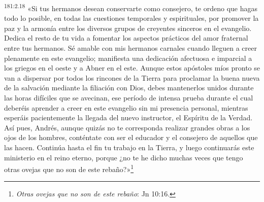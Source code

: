 \par 
\textsuperscript{181:2.18} «Si tus hermanos desean conservarte como consejero, te ordeno que hagas todo lo posible, en todas las cuestiones temporales y espirituales, por promover la paz y la armonía entre los diversos grupos de creyentes sinceros en el evangelio. Dedica el resto de tu vida a fomentar los aspectos prácticos del amor fraternal entre tus hermanos. Sé amable con mis hermanos carnales cuando lleguen a creer plenamente en este evangelio; manifiesta una dedicación afectuosa e imparcial a los griegos en el oeste y a Abner en el este. Aunque estos apóstoles míos pronto se van a dispersar por todos los rincones de la Tierra para proclamar la buena nueva de la salvación mediante la filiación con Dios, debes mantenerlos unidos durante las horas difíciles que se avecinan, ese período de intensa prueba durante el cual deberéis aprender a creer en este evangelio sin mi presencia personal, mientras esperáis pacientemente la llegada del nuevo instructor, el Espíritu de la Verdad. Así pues, Andrés, aunque quizás no te corresponda realizar grandes obras a los ojos de los hombres, conténtate con ser el educador y el consejero de aquellos que las hacen. Continúa hasta el fin tu trabajo en la Tierra, y luego continuarás este ministerio en el reino eterno, porque ¿no te he dicho muchas veces que tengo otras ovejas que no son de este rebaño?»\footnote{\textit{Otras ovejas que no son de este rebaño}: Jn 10:16.}

